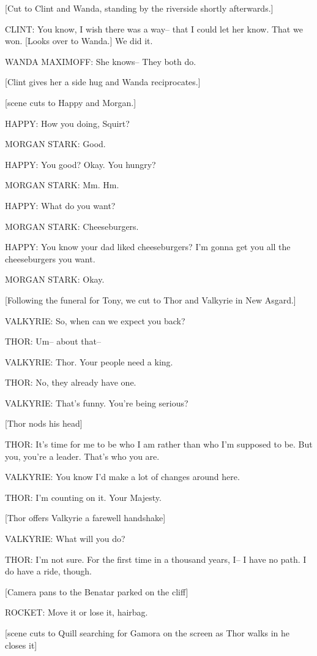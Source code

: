 [Cut to Clint and Wanda, standing by the riverside shortly afterwards.]

CLINT: You know, I wish there was a way– that I could let her know. That we won. [Looks over to Wanda.] We did it.

WANDA MAXIMOFF: She knows– They both do.

[Clint gives her a side hug and Wanda reciprocates.]

[scene cuts to Happy and Morgan.]

HAPPY: How you doing, Squirt?

MORGAN STARK: Good.

HAPPY: You good? Okay. You hungry?

MORGAN STARK: Mm. Hm.

HAPPY: What do you want?

MORGAN STARK: Cheeseburgers.

HAPPY: You know your dad liked cheeseburgers? I'm gonna get you all the cheeseburgers you want.

MORGAN STARK: Okay.

[Following the funeral for Tony, we cut to Thor and Valkyrie in New Asgard.]

VALKYRIE: So, when can we expect you back?

THOR: Um– about that–

VALKYRIE: Thor. Your people need a king.

THOR: No, they already have one.

VALKYRIE: That's funny. You're being serious?

[Thor nods his head]

THOR: It's time for me to be who I am rather than who I'm supposed to be. But you, you're a leader. That's who you are.

VALKYRIE: You know I'd make a lot of changes around here.

THOR: I'm counting on it. Your Majesty.

[Thor offers Valkyrie a farewell handshake]

VALKYRIE: What will you do?

THOR: I'm not sure. For the first time in a thousand years, I– I have no path. I do have a ride, though.

[Camera pans to the Benatar parked on the cliff]

ROCKET: Move it or lose it, hairbag.

[scene cuts to Quill searching for Gamora on the screen as Thor walks in he closes it]

